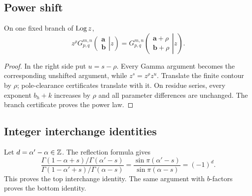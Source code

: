 \subsection{Power shift}

\begin{theorem}\label{thm:power-shift}
On one fixed branch of $\operatorname{Log} z$,
\begin{equation}\label{eq:power-shift}
 z^\rho G_{p,q}^{m,n}\!\left(
 \left.\begin{matrix}\mathbf a\\\mathbf b\end{matrix}\right|z\right)
 =G_{p,q}^{m,n}\!\left(
 \left.\begin{matrix}\mathbf a+\rho\\\mathbf b+\rho\end{matrix}\right|z\right).
\end{equation}
\end{theorem}
\begin{proof}
In the right side put $u=s-\rho$.  Every Gamma argument becomes the
corresponding unshifted argument, while $z^s=z^\rho z^u$.  Translate the finite
contour by $\rho$; pole-clearance certificates translate with it.  On residue
series, every exponent $b_h+k$ increases by $\rho$ and all parameter
differences are unchanged.  The branch certificate proves the power law.
\end{proof}

\subsection{Integer interchange identities}

Let $d=\alpha'-\alpha\in\mathbb Z$.  The reflection formula gives
\begin{equation}\label{eq:reflection-ratio}
 \frac{\Gamma(1-\alpha+s)/\Gamma(\alpha'-s)}
      {\Gamma(1-\alpha'+s)/\Gamma(\alpha-s)}
 =\frac{\sin\pi(\alpha'-s)}{\sin\pi(\alpha-s)}=(-1)^d.
\end{equation}
This proves the top interchange identity.  The same argument with $b$-factors
proves the bottom identity.

